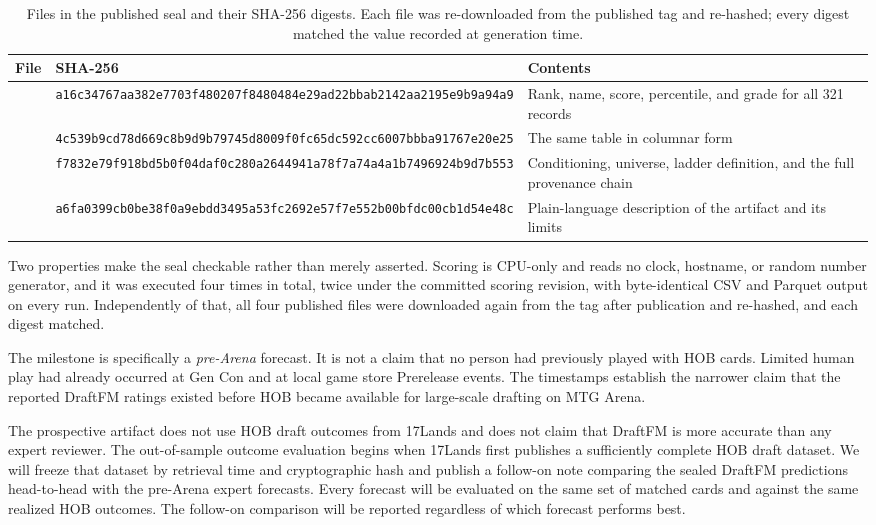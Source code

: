 \documentclass[11pt]{article}
\numberwithin{equation}{section}
\begin{document}
\begin{table}[tb]
\centering
\caption{Files in the published seal and their SHA-256 digests. Each file was
re-downloaded from the published tag and re-hashed; every digest matched the
value recorded at generation time.}
\label{tab:seal-artifact}
{\scriptsize
\setlength{\tabcolsep}{4pt}
\begin{tabular}{L{0.30\textwidth}L{0.31\textwidth}L{0.30\textwidth}}
\toprule
File & SHA-256 & Contents \\
\midrule
{} &
\texttt{a16c34767aa382e7\allowbreak 703f480207f84804\allowbreak 84e29ad22bbab214\allowbreak 2aa2195e9b9a94a9} &
Rank, name, score, percentile, and grade for all 321 records \\
\addlinespace
{} &
\texttt{4c539b9cd78d669c\allowbreak 8b9d9b79745d8009\allowbreak f0fc65dc592cc600\allowbreak 7bbba91767e20e25} &
The same table in columnar form \\
\addlinespace
{} &
\texttt{f7832e79f918bd5b\allowbreak 0f04daf0c280a264\allowbreak 4941a78f7a74a4a1\allowbreak b7496924b9d7b553} &
Conditioning, universe, ladder definition, and the full provenance chain \\
\addlinespace
{} &
\texttt{a6fa0399cb0be38f\allowbreak 0a9ebdd3495a53fc\allowbreak 2692e57f7e552b00\allowbreak bfdc00cb1d54e48c} &
Plain-language description of the artifact and its limits \\
\bottomrule
\end{tabular}
}
\end{table}

Two properties make the seal checkable rather than merely asserted. Scoring is
CPU-only and reads no clock, hostname, or random number generator, and it was
executed four times in total, twice under the committed scoring revision, with
byte-identical CSV and Parquet output on every run. Independently of that, all
four published files were downloaded again from the tag after publication and
re-hashed, and each digest matched.

The milestone is specifically a \emph{pre-Arena} forecast. It is not a
claim that no person had previously played with HOB cards. Limited human play
had already occurred at Gen Con and at local game store Prerelease events. The
timestamps establish the narrower claim that the reported DraftFM ratings
existed before HOB became available for large-scale drafting on MTG Arena.

The prospective artifact does not use HOB draft outcomes from 17Lands and does
not claim that DraftFM is more accurate than any expert reviewer. The
out-of-sample outcome evaluation begins when 17Lands first publishes a
sufficiently complete HOB draft dataset. We will freeze that dataset by
retrieval time and cryptographic hash and publish a follow-on note comparing the
sealed DraftFM predictions head-to-head with the pre-Arena expert forecasts.
Every forecast will be evaluated on the same set of matched cards and against
the same realized HOB outcomes. The follow-on comparison will be reported
regardless of which forecast performs best.
\end{document}
